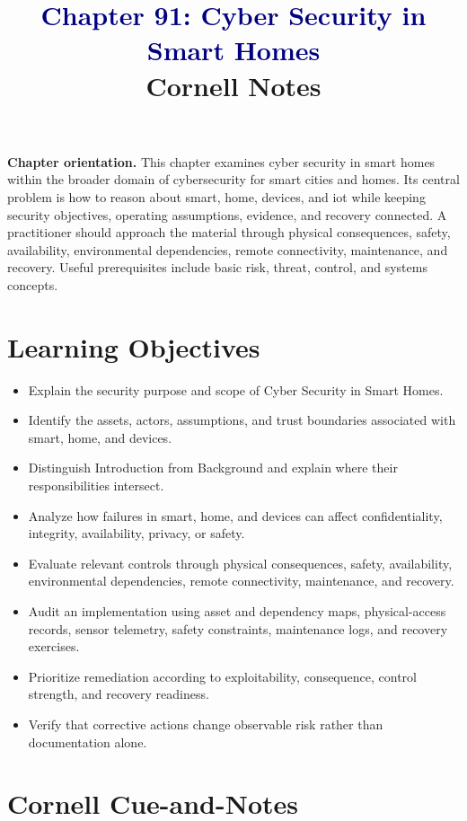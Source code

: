 \documentclass[11pt]{article}
\title{\textcolor{Navy}{Chapter 91: Cyber Security in Smart Homes}\\[2mm]\large Cornell Notes}
\author{}
\date{}
\begin{document}
\maketitle
\thispagestyle{fancy}
\vspace{-1.5em}
\begin{orientationbox}
\textbf{Chapter orientation.} This chapter examines cyber security in smart homes within the broader domain of cybersecurity for smart cities and homes. Its central problem is how to reason about smart, home, devices, and iot while keeping security objectives, operating assumptions, evidence, and recovery connected. A practitioner should approach the material through physical consequences, safety, availability, environmental dependencies, remote connectivity, maintenance, and recovery. Useful prerequisites include basic risk, threat, control, and systems concepts.
\end{orientationbox}
\section*{Learning Objectives}
\begin{itemize}
\item Explain the security purpose and scope of Cyber Security in Smart Homes.
\item Identify the assets, actors, assumptions, and trust boundaries associated with smart, home, and devices.
\item Distinguish Introduction from Background and explain where their responsibilities intersect.
\item Analyze how failures in smart, home, and devices can affect confidentiality, integrity, availability, privacy, or safety.
\item Evaluate relevant controls through physical consequences, safety, availability, environmental dependencies, remote connectivity, maintenance, and recovery.
\item Audit an implementation using asset and dependency maps, physical-access records, sensor telemetry, safety constraints, maintenance logs, and recovery exercises.
\item Prioritize remediation according to exploitability, consequence, control strength, and recovery readiness.
\item Verify that corrective actions change observable risk rather than documentation alone.
\end{itemize}
\section*{Cornell Cue-and-Notes}
\end{document}
